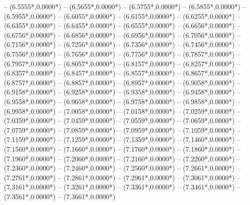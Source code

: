 {	-- ({6.5555*\dx},{0.0000*\dy})
	-- ({6.5655*\dx},{0.0000*\dy})
	-- ({6.5755*\dx},{0.0000*\dy})
	-- ({6.5855*\dx},{0.0000*\dy})
	-- ({6.5955*\dx},{0.0000*\dy})
	-- ({6.6055*\dx},{0.0000*\dy})
	-- ({6.6155*\dx},{0.0000*\dy})
	-- ({6.6255*\dx},{0.0000*\dy})
	-- ({6.6355*\dx},{0.0000*\dy})
	-- ({6.6455*\dx},{0.0000*\dy})
	-- ({6.6555*\dx},{0.0000*\dy})
	-- ({6.6656*\dx},{0.0000*\dy})
	-- ({6.6756*\dx},{0.0000*\dy})
	-- ({6.6856*\dx},{0.0000*\dy})
	-- ({6.6956*\dx},{0.0000*\dy})
	-- ({6.7056*\dx},{0.0000*\dy})
	-- ({6.7156*\dx},{0.0000*\dy})
	-- ({6.7256*\dx},{0.0000*\dy})
	-- ({6.7356*\dx},{0.0000*\dy})
	-- ({6.7456*\dx},{0.0000*\dy})
	-- ({6.7556*\dx},{0.0000*\dy})
	-- ({6.7656*\dx},{0.0000*\dy})
	-- ({6.7756*\dx},{0.0000*\dy})
	-- ({6.7857*\dx},{0.0000*\dy})
	-- ({6.7957*\dx},{0.0000*\dy})
	-- ({6.8057*\dx},{0.0000*\dy})
	-- ({6.8157*\dx},{0.0000*\dy})
	-- ({6.8257*\dx},{0.0000*\dy})
	-- ({6.8357*\dx},{0.0000*\dy})
	-- ({6.8457*\dx},{0.0000*\dy})
	-- ({6.8557*\dx},{0.0000*\dy})
	-- ({6.8657*\dx},{0.0000*\dy})
	-- ({6.8757*\dx},{0.0000*\dy})
	-- ({6.8857*\dx},{0.0000*\dy})
	-- ({6.8957*\dx},{0.0000*\dy})
	-- ({6.9058*\dx},{0.0000*\dy})
	-- ({6.9158*\dx},{0.0000*\dy})
	-- ({6.9258*\dx},{0.0000*\dy})
	-- ({6.9358*\dx},{0.0000*\dy})
	-- ({6.9458*\dx},{0.0000*\dy})
	-- ({6.9558*\dx},{0.0000*\dy})
	-- ({6.9658*\dx},{0.0000*\dy})
	-- ({6.9758*\dx},{0.0000*\dy})
	-- ({6.9858*\dx},{0.0000*\dy})
	-- ({6.9958*\dx},{0.0000*\dy})
	-- ({7.0058*\dx},{0.0000*\dy})
	-- ({7.0158*\dx},{0.0000*\dy})
	-- ({7.0259*\dx},{0.0000*\dy})
	-- ({7.0359*\dx},{0.0000*\dy})
	-- ({7.0459*\dx},{0.0000*\dy})
	-- ({7.0559*\dx},{0.0000*\dy})
	-- ({7.0659*\dx},{0.0000*\dy})
	-- ({7.0759*\dx},{0.0000*\dy})
	-- ({7.0859*\dx},{0.0000*\dy})
	-- ({7.0959*\dx},{0.0000*\dy})
	-- ({7.1059*\dx},{0.0000*\dy})
	-- ({7.1159*\dx},{0.0000*\dy})
	-- ({7.1259*\dx},{0.0000*\dy})
	-- ({7.1359*\dx},{0.0000*\dy})
	-- ({7.1460*\dx},{0.0000*\dy})
	-- ({7.1560*\dx},{0.0000*\dy})
	-- ({7.1660*\dx},{0.0000*\dy})
	-- ({7.1760*\dx},{0.0000*\dy})
	-- ({7.1860*\dx},{0.0000*\dy})
	-- ({7.1960*\dx},{0.0000*\dy})
	-- ({7.2060*\dx},{0.0000*\dy})
	-- ({7.2160*\dx},{0.0000*\dy})
	-- ({7.2260*\dx},{0.0000*\dy})
	-- ({7.2360*\dx},{0.0000*\dy})
	-- ({7.2460*\dx},{0.0000*\dy})
	-- ({7.2560*\dx},{0.0000*\dy})
	-- ({7.2661*\dx},{0.0000*\dy})
	-- ({7.2761*\dx},{0.0000*\dy})
	-- ({7.2861*\dx},{0.0000*\dy})
	-- ({7.2961*\dx},{0.0000*\dy})
	-- ({7.3061*\dx},{0.0000*\dy})
	-- ({7.3161*\dx},{0.0000*\dy})
	-- ({7.3261*\dx},{0.0000*\dy})
	-- ({7.3361*\dx},{0.0000*\dy})
	-- ({7.3461*\dx},{0.0000*\dy})
	-- ({7.3561*\dx},{0.0000*\dy})
	-- ({7.3661*\dx},{0.0000*\dy})
}
